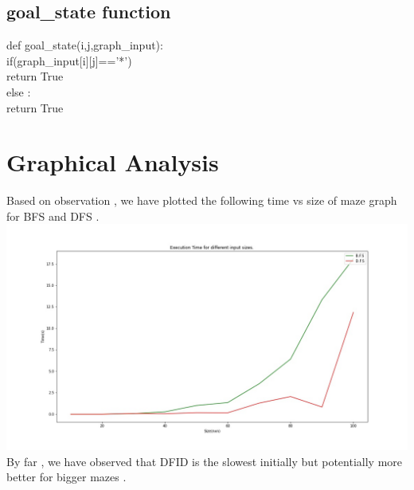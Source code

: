 \documentclass{article}
\begin{document}
\subsection*{goal\_state function}
    \vspace{5pt}
    def goal\_state(i,j,graph\_input):
    \vspace{5pt}
        \\ \hspace*{20pt}if(graph\_input[i][j]=='*')
        \vspace{5pt}
        \\ \hspace*{30pt} return True
        \vspace{2pt}
        \\ \hspace*{20pt}else :
        \vspace{5pt}
        \\ \hspace*{30pt} return True
\newpage
\section{Graphical Analysis}
\vspace{5pt}
Based on observation , we have plotted the following time vs size of maze graph for BFS and DFS .
\vspace{20pt}
\\\includegraphics[scale=0.3]{time.jpg}
\\By far , we have observed that DFID is the slowest initially but potentially more better for bigger mazes .
\newpage
\end{document}
